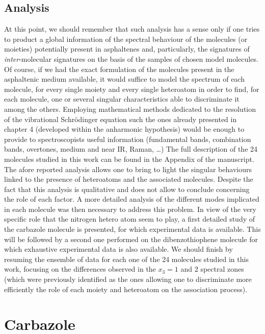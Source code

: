 \subsection{Analysis}

At this point, we should remember that such analysis has a sense only if one tries to product a global information of the spectral behaviour of the molecules (or moieties) potentially present in asphaltenes and, particularly, the signatures of \textit{inter}-molecular signatures on the basis of the samples of chosen model molecules. Of course, if we had the exact formulation of the molecules present in the asphaltenic medium available, it would suffice to model the spectrum of each molecule, for every single moiety and every single heteroatom in order to find, for each molecule, one or several singular characteristics able to discriminate it among the others. Employing mathematical methods dedicated to the resolution of the vibrational Schr\"{o}dinger equation such the ones already presented in chapter 4 (developed within the anharmonic hypothesis) would be enough to provide to spectroscopists useful information (fundamental bands, combination bands, overtones, medium and near IR, Raman, …) The full description of the 24 molecules studied in this work can be found in the Appendix of the manuscript.\\  

The afore reported analysis allows one to bring to light the singular behaviours linked to the presence of heteroatoms and the associated molecules. Despite the fact that this analysis is qualitative and does not allow to conclude concerning the role of each factor. A more detailed analysis of the different modes implicated in each molecule was then necessary to address this problem. In view of the very specific role that the nitrogen hetero atom seem to play, a first detailed study of the carbazole molecule is presented, for which experimental data is available. This will be followed by a second one performed on the dibenzothiophene molecule for which exhaustive experimental data is also available. We should finish by resuming the ensemble of data for each one of the 24 molecules studied in this work, focusing on the differences observed in the $x_3=1$ and $2$ spectral zones (which were previously identified as the ones allowing one to discriminate more efficiently the role of each moiety and heteroatom on the association process).	

\section{Carbazole}

